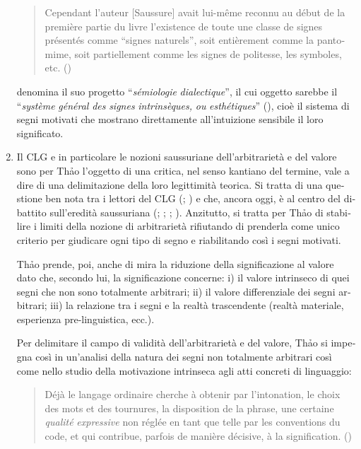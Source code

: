 \documentclass[italian,output=paper,colorlinks,citecolor=brown]{../langscibook}
\begin{document}
\begin{otherlanguage}{italian}
\begin{enumerate}
\begin{quote}
Cependant l’auteur [Saussure] avait lui-même reconnu au début de la première partie du livre l’existence de toute une classe de signes présentés comme “signes naturels”, soit entièrement comme la pantomime, soit partiellement comme les signes de politesse, les symboles, etc. (\citealt[39]{Thao1974})
\end{quote}

\citet[42]{Thao1974} denomina il suo progetto “\textit{sémiologie} \textit{dialectique}”, il cui oggetto sarebbe il “\textit{système} \textit{général} \textit{des} \textit{signes} \textit{intrinsèques,} \textit{ou} \textit{esthétiques}” (\citealt[40]{Thao1974}), cioè il sistema di segni motivati che mostrano direttamente all’intuizione sensibile il loro significato.

\item Il CLG e in particolare le nozioni saussuriane dell’arbitrarietà e del valore sono per Th\textlatin{ả}o l’oggetto di una critica, nel senso kantiano del termine, vale a dire di una delimitazione della loro legittimità teorica. Si tratta di una questione ben nota tra i lettori del CLG (\citealt[413--416]{De-Mauro2011}; \citealt{Sofia2013}) e che, ancora oggi, è al centro del dibattito sull’eredità saussuriana (\citealt{Rastier2002}; \citealt{Paolucci2012}; \citealt{Laks2012}; \citealt{Coursil2015}). Anzitutto, si tratta per Th\textlatin{ả}o di stabilire i limiti della nozione di arbitrarietà rifiutando di prenderla come unico criterio per giudicare ogni tipo di segno e riabilitando così i segni motivati.

Th\textlatin{ả}o prende, poi, anche di mira la riduzione della significazione al valore dato che, secondo lui, la significazione concerne: i) il valore intrinseco di quei segni che non sono totalmente arbitrari; ii) il valore differenziale dei segni arbitrari; iii) la relazione tra i segni e la realtà trascendente (realtà materiale, esperienza pre-linguistica, ecc.).

Per delimitare il campo di validità dell’arbitrarietà e del valore, Th\textlatin{ả}o si impegna così in un’analisi della natura dei segni non totalmente arbitrari così come nello studio della motivazione intrinseca agli atti concreti di linguaggio:

\begin{quote}
    Déjà le langage ordinaire cherche à obtenir par l’intonation, le choix des mots et des tournures, la disposition de la phrase, une certaine \textit{qualité} \textit{expressive} non réglée en tant que telle par les conventions du code, et qui contribue, parfois de manière décisive, à la signification. (\citealt[39--40]{Thao1974})
\end{quote}


\end{enumerate}
\end{otherlanguage}
\end{document}
